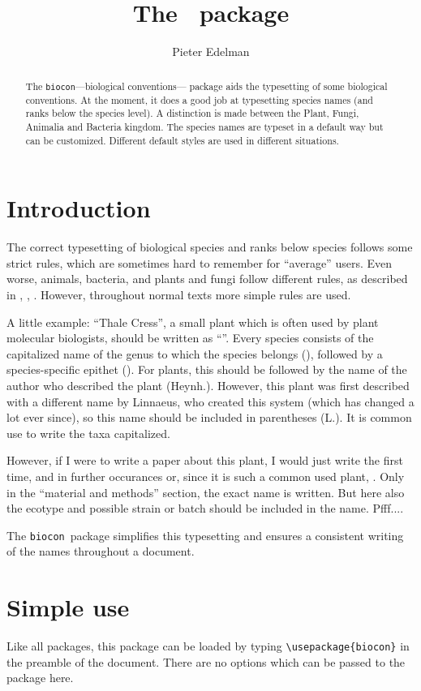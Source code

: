 \documentclass{article}
\title{The \biocon\ package}
\author{Pieter Edelman}
\newcommand{\biocon}{\texttt{biocon}}
\begin{document}
\maketitle
\tableofcontents

\begin{abstract}
The \biocon---biological conventions--- package aids the typesetting of some biological conventions. At the moment, it does a good job at typesetting species names (and ranks below the species level). A distinction is made between the Plant, Fungi, Animalia and Bacteria kingdom. The species names are typeset in a default way but can be customized. Different default styles are used in different situations.  
\end{abstract}
\section{Introduction}
The correct typesetting of biological species and ranks below species follows some strict rules, which are sometimes hard to remember for ``average'' users. Even worse, animals, bacteria, and plants and fungi follow different rules, as described in \cite{Animals}, \cite{Bacteria}, \cite{Plants}. However, throughout normal texts more simple rules are used. 

A little example: ``Thale Cress'', a small plant which is often used by plant molecular biologists, should be written as ``''. Every species consists of the capitalized name of the genus to which the species belongs (), followed by a species-specific epithet (). For plants, this should be followed by the name of the author who described the plant (Heynh.). However, this plant was first described with a different name by Linnaeus, who created this system (which has changed a lot ever since), so this name should be included in parentheses (L.). It is common use to write the taxa capitalized.

However, if I were to write a paper about this plant, I would just write  the first time, and in further occurances  or, since it is such a common used plant, . Only in the ``material and methods'' section, the exact name is written. But here also the ecotype and possible strain or batch should be included in the name. Pfff.... 

The \biocon\ package simplifies this typesetting and ensures a consistent writing of the names throughout a document.
\section{Simple use}
Like all packages, this package can be loaded by typing \verb!\usepackage{biocon}! in the preamble of the document. There are no options which can be passed to the package here.
\end{document}
